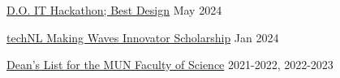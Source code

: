 \href{https://github.com/EthanDenny/do-it-hackathon}{D.O. IT Hackathon; Best Design} \hfill May 2024 \par
\href{https://technl.ca/}{techNL Making Waves Innovator Scholarship} \hfill Jan 2024 \par
\href{https://www.mun.ca/science/undergraduates/scholarships-and-awards/deans-list/}{Dean's List for the MUN Faculty of Science} \hfill 2021-2022, 2022-2023 \par
